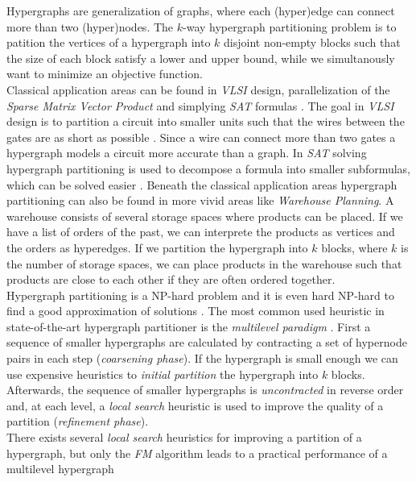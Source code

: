 Hypergraphs are generalization of graphs, where each (hyper)edge can connect 
more than two (hyper)nodes. The $k$-way hypergraph partitioning problem is to 
patition the vertices of a hypergraph into $k$ disjoint non-empty blocks such
that the size of each block satisfy a lower and upper bound, while we simultanously 
want to minimize an objective function. \\
Classical application areas can be found in \emph{VLSI} design, parallelization of
the \emph{Sparse Matrix Vector Product} and simplying \emph{SAT} formulas 
\cite{karypis1999multilevel, mann2014formula, papa2007hypergraph}. The goal 
in \emph{VLSI} design is to partition a circuit into smaller units such that
the wires between the gates are as short as possible \cite{bulucc2016recent}.
Since a wire can connect more than two gates a hypergraph models a circuit more
accurate than a graph. In \emph{SAT} solving hypergraph partitioning is used to
decompose a formula into smaller subformulas, which can be solved easier \cite{mann2014formula}.
Beneath the classical application areas hypergraph partitioning can also be found
in more vivid areas like \emph{Warehouse Planning}. A warehouse consists of several
storage spaces where products can be placed. If we have a list of orders of the
past, we can interprete the products as vertices and the orders as hyperedges. If we
partition the hypergraph into $k$ blocks, where $k$ is the number of storage spaces,
we can place products in the warehouse such that products are close to each other if
they are often ordered together.\\
Hypergraph partitioning is a NP-hard problem \cite{lengauer2012combinatorial} and
it is even hard NP-hard to find a good approximation of solutions \cite{bui1992finding}.
The most common used heuristic in state-of-the-art hypergraph partitioner is the
\emph{multilevel paradigm} \cite{catalyurek1999hypergraph, heuer2017improving, karypis1999multilevel}.
First a sequence of smaller hypergraphs are calculated by contracting a set of hypernode pairs
in each step (\emph{coarsening phase}). If the hypergraph is small enough we can use expensive
heuristics to \emph{initial partition} the hypergraph into $k$ blocks. Afterwards, the sequence
of smaller hypergraphs is \emph{uncontracted} in reverse order and, at each level, a 
\emph{local search} heuristic is used to improve the quality of a partition 
(\emph{refinement phase}). \\
There exists several \emph{local search} heuristics for improving a partition of a hypergraph,
but only the \emph{FM} algorithm leads to a practical performance of a multilevel hypergraph
